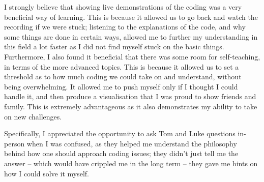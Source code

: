 \documentclass[
  12pt,
  a5paper,
]{book}
\begin{document}
I strongly believe that showing live demonstrations of the coding was a very beneficial way of learning. This is because it allowed us to go back and watch the recording if we were stuck; listening to the explanations of the code, and why some things are done in certain ways, allowed me to further my understanding in this field a lot faster as I did not find myself stuck on the basic things. Furthermore, I also found it beneficial that there was some room for self-teaching, in terms of the more advanced topics. This is because it allowed us to set a threshold as to how much coding we could take on and understand, without being overwhelming. It allowed me to push myself only if I thought I could handle it, and then produce a visualisation that I was proud to show friends and family. This is extremely advantageous as it also demonstrates my ability to take on new challenges.

Specifically, I appreciated the opportunity to ask Tom and Luke questions in-person when I was confused, as they helped me understand the philosophy behind how one should approach coding issues; they didn't just tell me the answer -- which would have crippled me in the long term -- they gave me hints on how I could solve it myself.

  
\end{document}
